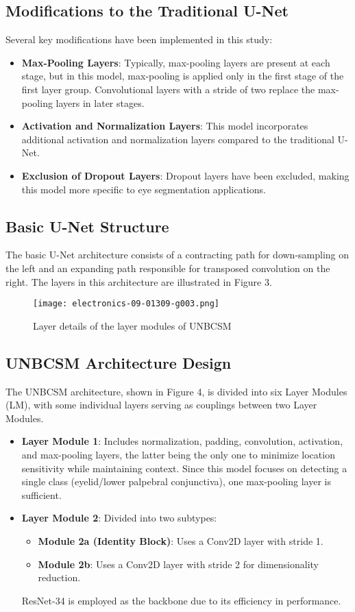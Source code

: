 \documentclass[conference]{IEEEtran}
\begin{document}
\subsection{\textbf{Modifications to the Traditional U-Net}}
Several key modifications have been implemented in this study:
\begin{itemize}
    \item \textbf{Max-Pooling Layers}: Typically, max-pooling layers are present at each stage, but in this model, max-pooling is applied only in the first stage of the first layer group. Convolutional layers with a stride of two replace the max-pooling layers in later stages.
    \item \textbf{Activation and Normalization Layers}: This model incorporates additional activation and normalization layers compared to the traditional U-Net.
    \item \textbf{Exclusion of Dropout Layers}: Dropout layers have been excluded, making this model more specific to eye segmentation applications.
\end{itemize}

\subsection{\textbf{Basic U-Net Structure}}
The basic U-Net architecture consists of a contracting path for down-sampling on the left and an expanding path responsible for transposed convolution on the right. The layers in this architecture are illustrated in Figure 3.

\begin{figure}[htbp]
\centerline{\texttt{[image: electronics-09-01309-g003.png]}}
\caption{ Layer details of the layer modules of UNBCSM}
\label{fig}
\end{figure}

\subsection{\textbf{UNBCSM Architecture Design}}
The UNBCSM architecture, shown in Figure 4, is divided into six Layer Modules (LM), with some individual layers serving as couplings between two Layer Modules. 
\begin{itemize}
    \item \textbf{Layer Module 1}: Includes normalization, padding, convolution, activation, and max-pooling layers, the latter being the only one to minimize location sensitivity while maintaining context. Since this model focuses on detecting a single class (eyelid/lower palpebral conjunctiva), one max-pooling layer is sufficient.
    \item \textbf{Layer Module 2}: Divided into two subtypes: 
    \begin{itemize}
        \item \textbf{Module 2a (Identity Block)}: Uses a Conv2D layer with stride 1.
        \item \textbf{Module 2b}: Uses a Conv2D layer with stride 2 for dimensionality reduction. 
    \end{itemize}
    ResNet-34 is employed as the backbone due to its efficiency in performance.
\end{itemize}
\end{document}
